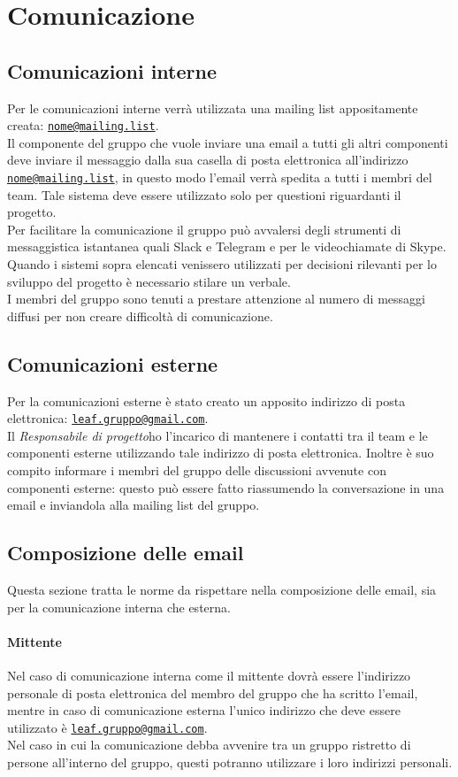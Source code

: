 \documentclass[float=false, crop=false]{standalone}
\makeatletter
\newcommand{\mail}[1]{\href{mailto:#1}{\texttt{#1}}}
\newcommand{\mailleaf}{\mail{leaf.gruppo@gmail.com}}
\newcommand{\mailinglist}{\mail{nome@mailing.list}}
\newcommand{\responsabilediprogetto}{\textit{Responsabile di progetto}}
\makeatother
\begin{document}
	\section{Comunicazione}
		\subsection{Comunicazioni interne}
		Per le comunicazioni interne verrà utilizzata una mailing list appositamente creata: \mailinglist. \\
		Il componente del gruppo che vuole inviare una email a tutti gli altri componenti deve inviare il messaggio dalla sua casella di posta elettronica all'indirizzo \mailinglist, in questo modo l'email verrà spedita a tutti i membri del team. Tale sistema deve essere utilizzato solo per questioni riguardanti il progetto. \\
		Per facilitare la comunicazione il gruppo può avvalersi degli strumenti di messaggistica istantanea quali Slack e Telegram e per le videochiamate di Skype. \\
		Quando i sistemi sopra elencati venissero utilizzati per decisioni rilevanti per lo sviluppo del progetto è necessario stilare un verbale.\\
		I membri del gruppo sono tenuti a prestare attenzione al numero di messaggi diffusi per non creare difficoltà di comunicazione. 
		\subsection{Comunicazioni esterne}
		Per la comunicazioni esterne è stato creato un apposito indirizzo di posta elettronica: \mailleaf. \\
		Il \responsabilediprogetto ho l'incarico di mantenere i contatti tra il team e le componenti esterne utilizzando tale indirizzo di posta elettronica. Inoltre è suo compito informare i membri del gruppo delle discussioni avvenute con componenti esterne: questo può essere fatto riassumendo la conversazione in una email e inviandola alla mailing list del gruppo.
		\subsection{Composizione delle email}
		Questa sezione tratta le norme da rispettare nella composizione delle email, sia per la comunicazione interna che esterna.
		\paragraph{Mittente}
		Nel caso di comunicazione interna come il mittente dovrà essere l'indirizzo personale di posta elettronica del membro del gruppo che ha scritto l'email, mentre in caso di comunicazione esterna l'unico indirizzo che deve essere utilizzato è \mailleaf. \\ Nel caso in cui la comunicazione debba avvenire tra un gruppo ristretto di persone all'interno del gruppo, questi potranno utilizzare i loro indirizzi personali.
\end{document}
